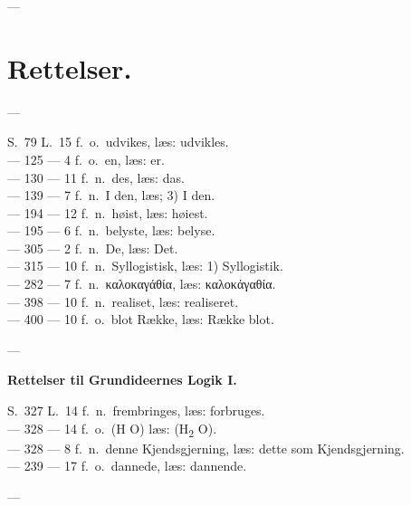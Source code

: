 \documentclass[12pt]{book}
\newcommand{\opage}[1]{\marginnote{\footnotesize\textit{[#1]}}}
\begin{document}
\begin{center}---\end{center}

\chapter*{Rettelser.}
\opage{[VI]}%
\begin{center}---\end{center}
{\setlength{\parindent}{0pt}
S.\ 79 L.\ 15 f.\ o.\ udvikes, læs: udvikles.\\
--- 125 --- 4 f.\ o.\ en, læs: er.\\
--- 130 --- 11 f.\ n.\ des, læs: das.\\
--- 139 --- 7 f.\ n.\ I den, læs; 3) I den.\\
--- 194 --- 12 f.\ n.\ høist, læs: høiest.\\
--- 195 --- 6 f.\ n.\ belyste, læs: belyse.\\
--- 305 --- 2 f.\ n.\ De, læs: Det.\\
--- 315 --- 10 f.\ n.\ Syllogistisk, læs: 1) Syllogistik.\\
--- 282 --- 7 f.\ n.\ καλοκαγάθία, læs: καλοκἀγαθία.\\
--- 398 --- 10 f.\ n.\ realiset, læs: realiseret.\\
--- 400 --- 10 f.\ o.\ blot Række, læs: Række blot.\par}
\begin{center}---\end{center}
\begin{center}{\bfseries Rettelser til Grundideernes Logik I.}\end{center}
{\setlength{\parindent}{0pt}
S.\ 327 L.\ 14 f.\ n.\ frembringes, læs: forbruges.\\
--- 328 --- 14 f.\ o.\ (H O) læs: (H\textsubscript{2} O).\\
--- 328 --- 8 f.\ n.\ denne Kjendsgjerning, læs: dette som Kjendsgjerning.\\
--- 239 --- 17 f.\ o.\ dannede, læs: dannende.\par}
\begin{center}---\end{center}
\end{document}
